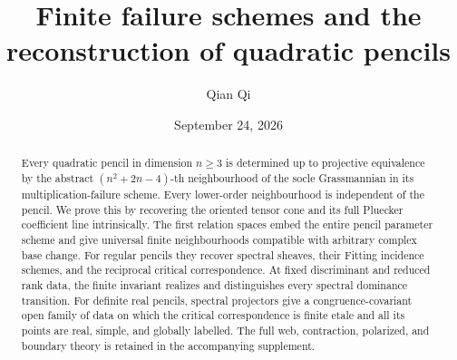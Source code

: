 \title[Finite failure schemes and quadratic pencils]{Finite failure schemes and the reconstruction of quadratic pencils}
\author{Qian Qi}
\date{September 24, 2026}
\begin{abstract}
Every quadratic pencil in dimension \(n\ge3\) is determined up to
projective equivalence by the abstract \((n^2+2n-4)\)-th neighbourhood
of the socle Grassmannian in its multiplication-failure scheme.
Every lower-order neighbourhood is independent of the pencil.
We prove this by recovering the oriented tensor cone and its full
Pluecker coefficient line intrinsically.  The first relation spaces
embed the entire pencil parameter scheme and give universal finite
neighbourhoods compatible with arbitrary complex base change.
For regular pencils they recover spectral sheaves, their Fitting
incidence schemes, and the reciprocal critical correspondence.
At fixed discriminant and reduced rank data, the finite invariant
realizes and distinguishes every spectral dominance transition.
For definite real pencils, spectral projectors give a congruence-covariant
open family of data on which the critical correspondence is finite
etale and all its points are real, simple, and globally labelled.
The full web, contraction, polarized, and boundary theory is retained
in the accompanying supplement.
\end{abstract}
\maketitle
